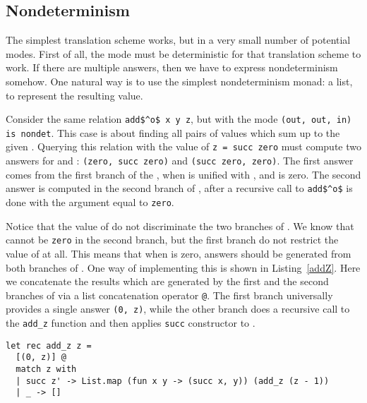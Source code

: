 \subsection{Nondeterminism}

The simplest translation scheme works, but in a very small number of potential modes.
First of all, the mode must be deterministic for that translation scheme to work.
If there are multiple answers, then we have to express nondeterminism somehow.
One natural way is to use the simplest nondeterminism monad: a list, to represent the resulting value.

Consider the same relation \lstinline{add$^o$ x y z}, but with the mode \lstinline{(out, out, in) is nondet}.
This case is about finding all pairs of values which sum up to the given \z.
Querying this relation with the value of \lstinline{z = succ zero} must compute two answers for \x and \y: \lstinline{(zero, succ zero)} and \lstinline{(succ zero, zero)}.
The first answer comes from the first branch of the \conde, when \z is unified with \y, and \x is zero.
The second answer is computed in the second branch of \conde, after a recursive call to \lstinline{add$^o$} is done with the argument equal to \lstinline{zero}.

Notice that the value of \z do not discriminate the two branches of \conde.
We know that \z cannot be \lstinline{zero} in the second branch, but the first branch do not restrict the value of \z at all.
This means that when \z is zero, answers should be generated from both branches of \conde.
One way of implementing this is shown in Listing~\ref{addZ}.
Here we concatenate the results which are generated by the first and the second branches of \conde via a list concatenation operator \lstinline{@}.
The first branch universally provides a single answer \lstinline{(0, z)}, while the other branch does a recursive call to the \lstinline{add_z} function and then applies \lstinline{succ} constructor to \x.

\begin{figure*}[!t]
  \centering
  \begin{minipage}{0.68\textwidth}
    \begin{lstlisting}[label={addZ}, caption={Functional representation of \lstinline{addo x y z} with the mode \lstinline{(out, out, in) is nondet}}, captionpos=b, frame=tb]
let rec add_z z =
  [(0, z)] @
  match z with
  | succ z' -> List.map (fun x y -> (succ x, y)) (add_z (z - 1))
  | _ -> []
    \end{lstlisting}
  \end{minipage}
\end{figure*}

